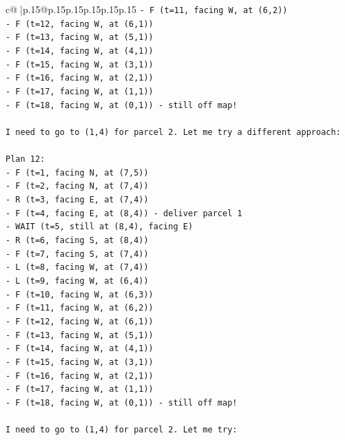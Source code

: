 \documentclass{article}
\begin{document}
{\begin{supertabular}{c@{$\;$}|p{.15\linewidth}@{}p{.15\linewidth}p{.15\linewidth}p{.15\linewidth}p{.15\linewidth}p{.15\linewidth}}
{{{\texttt{{-} F (t=11, facing W, at (6,2))} \\
\texttt{{-} F (t=12, facing W, at (6,1))} \\
\texttt{{-} F (t=13, facing W, at (5,1))} \\
\texttt{{-} F (t=14, facing W, at (4,1))} \\
\texttt{{-} F (t=15, facing W, at (3,1))} \\
\texttt{{-} F (t=16, facing W, at (2,1))} \\
\texttt{{-} F (t=17, facing W, at (1,1))} \\
\texttt{{-} F (t=18, facing W, at (0,1)) {-} still off map!} \\
\\ 
\texttt{I need to go to (1,4) for parcel 2. Let me try a different approach:} \\
\\ 
\texttt{Plan 12:} \\
\texttt{{-} F (t=1, facing N, at (7,5))} \\
\texttt{{-} F (t=2, facing N, at (7,4))} \\
\texttt{{-} R (t=3, facing E, at (7,4))} \\
\texttt{{-} F (t=4, facing E, at (8,4)) {-} deliver parcel 1} \\
\texttt{{-} WAIT (t=5, still at (8,4), facing E)} \\
\texttt{{-} R (t=6, facing S, at (8,4))} \\
\texttt{{-} F (t=7, facing S, at (7,4))} \\
\texttt{{-} L (t=8, facing W, at (7,4))} \\
\texttt{{-} L (t=9, facing W, at (6,4))} \\
\texttt{{-} F (t=10, facing W, at (6,3))} \\
\texttt{{-} F (t=11, facing W, at (6,2))} \\
\texttt{{-} F (t=12, facing W, at (6,1))} \\
\texttt{{-} F (t=13, facing W, at (5,1))} \\
\texttt{{-} F (t=14, facing W, at (4,1))} \\
\texttt{{-} F (t=15, facing W, at (3,1))} \\
\texttt{{-} F (t=16, facing W, at (2,1))} \\
\texttt{{-} F (t=17, facing W, at (1,1))} \\
\texttt{{-} F (t=18, facing W, at (0,1)) {-} still off map!} \\
\\ 
\texttt{I need to go to (1,4) for parcel 2. Let me try:} \\
}}}
\end{supertabular}}
\end{document}
